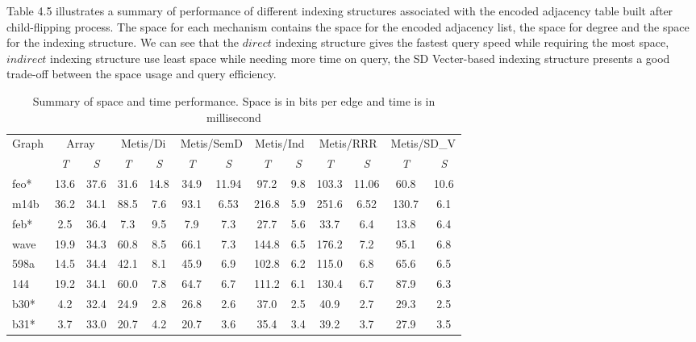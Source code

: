 \documentclass[12pt,glossary]{dalthesis}
\begin{document}
\bigskip

Table 4.5 illustrates a summary of performance of different indexing structures associated with the encoded adjacency table built after child-flipping process. The space for each mechanism contains the space for the encoded adjacency list, the space for degree and the space for the indexing structure. We can see that the $direct$ indexing structure gives the fastest query speed while requiring the most space, $indirect$ indexing structure use least space while needing more time on query, the SD Vecter-based indexing structure presents a good trade-off between the space usage and query efficiency. 


\begin{table}[ht]
\centering
\caption{Summary of space and time performance. Space is in bits per edge and time is in millisecond}
\label{my-label}
\begin{tabular}{|l||c|c||c|c||c|c||c|c||c|c||c|c|}
\hline
\multirow{2}{*}{Graph} & \multicolumn{2}{c||}{Array} & \multicolumn{2}{c||}{Metis/Di} & \multicolumn{2}{c||}{Metis/SemD} & \multicolumn{2}{c||}{Metis/Ind} & \multicolumn{2}{c||}{Metis/RRR} & \multicolumn{2}{c|}{Metis/SD\_V} \\ \cline{2-13}
                       & \textit{T}        & \textit{S}       & \textit{T}           & \textit{S}           & \textit{T} & \textit{S}          & \textit{T}            & \textit{S}           & \textit{T}          & \textit{S}        & \textit{T} & \textit{S} \\ \hline
feo*          & 13.6  & 37.6   &  31.6  &  14.8  &  34.9   &   11.94  &  97.2  &  9.8  &  103.3  &  11.06  &  60.8  &  10.6              \\
m14b          & 36.2  & 34.1   &  88.5  &  7.6  &  93.1   &  6.53   &  216.8  &  5.9  &  251.6  &  6.52  &  130.7  &   6.1             \\
feb*          & 2.5   & 36.4   &  7.3   &  9.5  &  7.9   &  7.3   &  27.7  &  5.6  &  33.7  &  6.4  &  13.8  &  6.4              \\
wave          & 19.9  & 34.3   &  60.8  &  8.5  &  66.1   &  7.3   &  144.8  &  6.5  &  176.2  &  7.2  &  95.1  &  6.8              \\
598a          & 14.5  & 34.4   &  42.1  &  8.1   &  45.9   &  6.9   &  102.8  &  6.2  &  115.0  &  6.8  &  65.6  &  6.5              \\
144           & 19.2  & 34.1   & 60.0   &  7.8  &   64.7  &  6.7   &  111.2  &  6.1  &  130.4   &  6.7  &  87.9  &  6.3              \\
b30*          & 4.2   & 32.4   &  24.9  &  2.8  &  26.8   &  2.6   &  37.0  &  2.5  &  40.9  &  2.7  &  29.3  &   2.5             \\ 
b31*          & 3.7   &  33.0  &  20.7  &  4.2  &   20.7  &   3.6  &  35.4  &  3.4  &  39.2  &  3.7  &  27.9  &   3.5             \\ \hline


\end{tabular}
\end{table}
\end{document}

